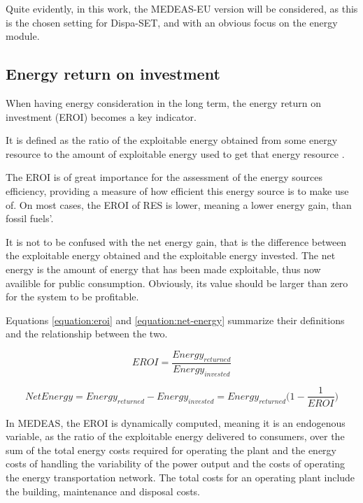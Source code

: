 Quite evidently, in this work, the MEDEAS-EU version will be considered, as this is the chosen setting for Dispa-SET, and with an obvious focus on the energy module. 

\subsection{Energy return on investment}

When having energy consideration in the long term, the energy return on investment (EROI) becomes a key indicator.

It is defined as the ratio of the exploitable energy obtained from some energy resource to the amount of exploitable energy used to get that energy resource \cite{wiki-eroi}.

The EROI is of great importance for the assessment of the energy sources efficiency, providing a measure of how efficient this energy source is to make use of. On most cases, the EROI of RES is lower, meaning a lower energy gain, than fossil fuels'.

It is not to be confused with the net energy gain, that is the difference between the exploitable energy obtained and the exploitable energy invested. The net energy is the amount of energy that has been made exploitable, thus now availible for public consumption. Obviously, its value should be larger than zero for the system to be profitable.

Equations \ref{equation:eroi} and \ref{equation:net-energy} summarize their definitions and the relationship between the two.

\begin{equation}
    EROI=\frac{Energy_{returned}}{Energy_{invested}}
    \label{equation:eroi}
\end{equation}

\begin{equation}
    NetEnergy = Energy_{returned} - Energy_{invested} = Energy_{returned} \Big( 1 - \frac{1}{EROI}\Big)
    \label{equation:net-energy}
\end{equation}

In MEDEAS, the EROI is dynamically computed, meaning it is an endogenous variable, as the ratio of the exploitable energy delivered to consumers, over the sum of the total energy costs required for operating the plant and the energy costs of handling the variability of the power output and the costs of operating the energy transportation network. The total costs for an operating plant include the building, maintenance and disposal costs.

